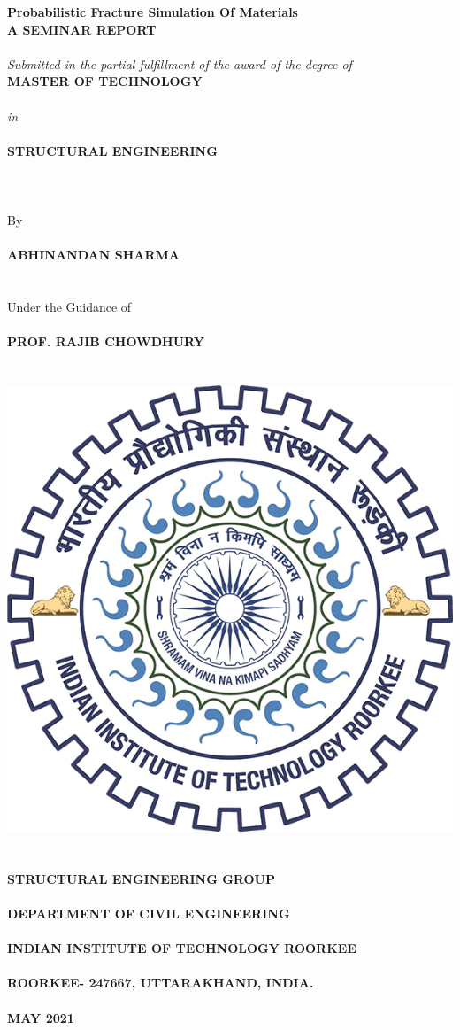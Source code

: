 \documentclass[12pt]{article}
\begin{document}
{\setmainfont{Times New Roman}
\begin{center}


    \vspace*{\fill}
    \textbf{\huge Probabilistic Fracture Simulation Of Materials}
   \textbf{\\[.75in]\Large A SEMINAR REPORT\\~\\}
    \textit{\large Submitted in the partial fulfillment of the award of the degree of}\\[.55in]
    \textbf{\Large MASTER OF TECHNOLOGY}\\~\\\textit{\Large in}\\~\\ \textbf{\Large STRUCTURAL ENGINEERING}
    \\~\\~\\~\\{\Large By}\\~\\  \textbf{\Large ABHINANDAN SHARMA}\\~\\~\\
    Under the Guidance of
    \textbf{\\~\\\Large PROF. RAJIB CHOWDHURY}\\~\\~\\
    \includegraphics[width=.3\textwidth]{iitr.png}\\~\\~\\
    {\bf\large STRUCTURAL ENGINEERING GROUP\\~\\
DEPARTMENT OF CIVIL ENGINEERING\\~\\
INDIAN INSTITUTE OF TECHNOLOGY ROORKEE\\~\\
ROORKEE- 247667, UTTARAKHAND, INDIA.\\~\\
MAY 2021}
    \vspace*{\fill}
\end{center}
\pagebreak  

}
\end{document}
